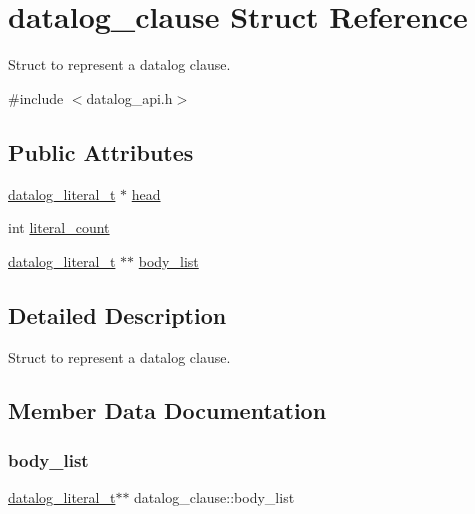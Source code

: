 \hypertarget{structdatalog__clause}{}\section{datalog\+\_\+clause Struct Reference}
\label{structdatalog__clause}


Struct to represent a datalog clause.  




{\ttfamily \#include $<$datalog\+\_\+api.\+h$>$}

\subsection*{Public Attributes}
\begin{DoxyCompactItemize}
\item 
\hyperlink{datalog__api_8h_aeb86f46db4f8142eeb397d20f69f6487}{datalog\+\_\+literal\+\_\+t} $\ast$ \hyperlink{structdatalog__clause_a76efe58a26d93f778904a8ab8f7e12d6}{head}
\item 
int \hyperlink{structdatalog__clause_abcd26a3624b9be0f775ca0828bb2deb9}{literal\+\_\+count}
\item 
\hyperlink{datalog__api_8h_aeb86f46db4f8142eeb397d20f69f6487}{datalog\+\_\+literal\+\_\+t} $\ast$$\ast$ \hyperlink{structdatalog__clause_abe6251f128a0a671904372837405b66a}{body\+\_\+list}
\end{DoxyCompactItemize}


\subsection{Detailed Description}
Struct to represent a datalog clause. 

\subsection{Member Data Documentation}
\mbox{\label{structdatalog__clause_abe6251f128a0a671904372837405b66a}} 
\subsubsection{\texorpdfstring{body\+\_\+list}{body\_list}}
{\footnotesize\ttfamily \hyperlink{datalog__api_8h_aeb86f46db4f8142eeb397d20f69f6487}{datalog\+\_\+literal\+\_\+t}$\ast$$\ast$ datalog\+\_\+clause\+::body\+\_\+list}

